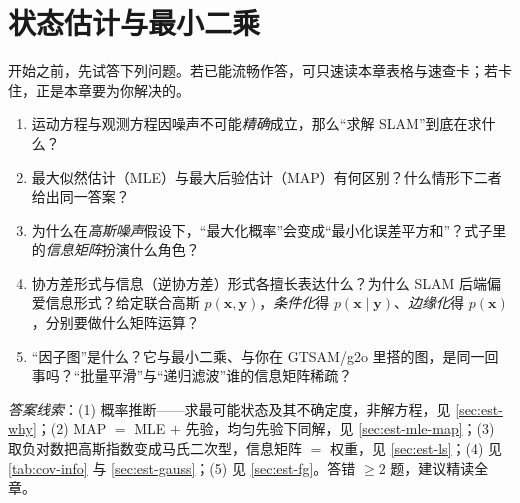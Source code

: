 \chapter{状态估计与最小二乘}
\label{ch:slam_est}


\begin{practice}[前置自测]
开始之前，先试答下列问题。若已能流畅作答，可只速读本章表格与速查卡；若卡住，正是本章要为你解决的。
\begin{enumerate}
  \item 运动方程与观测方程因噪声不可能\emph{精确}成立，那么“求解 SLAM”到底在求什么？
  \item 最大似然估计（MLE）与最大后验估计（MAP）有何区别？什么情形下二者给出同一答案？
  \item 为什么在\emph{高斯噪声}假设下，“最大化概率”会变成“最小化误差平方和”？式子里的\emph{信息矩阵}扮演什么角色？
  \item 协方差形式与信息（逆协方差）形式各擅长表达什么？为什么 SLAM 后端偏爱信息形式？给定联合高斯 $p(\mathbf{x},\mathbf{y})$，\emph{条件化}得 $p(\mathbf{x}\mid\mathbf{y})$、\emph{边缘化}得 $p(\mathbf{x})$，分别要做什么矩阵运算？
  \item “因子图”是什么？它与最小二乘、与你在 GTSAM/g2o 里搭的图，是同一回事吗？“批量平滑”与“递归滤波”谁的信息矩阵稀疏？
\end{enumerate}
\noindent\emph{答案线索}：(1) 概率推断——求最可能状态及其不确定度，非解方程，见 \cref{sec:est-why}；(2) MAP $=$ MLE $+$ 先验，均匀先验下同解，见 \cref{sec:est-mle-map}；(3) 取负对数把高斯指数变成马氏二次型，信息矩阵 $=$ 权重，见 \cref{sec:est-ls}；(4) 见 \cref{tab:cov-info} 与 \cref{sec:est-gauss}；(5) 见 \cref{sec:est-fg}。答错 $\ge 2$ 题，建议精读全章。
\end{practice}

